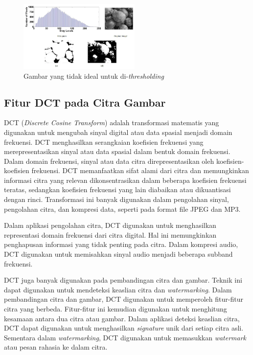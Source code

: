 \begin{figure}[!ht]
	\centering
	\includegraphics[width=6cm]{contents/chapter-2/2-histogramnonideal.png}
	\caption[Gambar yang tidak ideal untuk di-\emph{thresholding}]{Gambar yang tidak ideal untuk di-\emph{thresholding} \cite{fiturhistogram}}
	\label{Fig: 2-histogramnonideal}
\end{figure}

\clearpage

\subsection{Fitur DCT pada Citra Gambar}
DCT (\emph{Discrete Cosine Transform}) adalah transformasi matematis yang digunakan untuk mengubah sinyal digital atau data spasial menjadi domain frekuensi.
DCT menghasilkan serangkaian koefisien frekuensi yang merepresentasikan sinyal atau data spasial dalam bentuk domain frekuensi. Dalam domain frekuensi, sinyal
atau data citra direpresentasikan oleh koefisien-koefisien frekuensi. DCT memanfaatkan sifat alami dari citra dan memungkinkan informasi citra yang relevan
dikonsentrasikan dalam beberapa koefisien frekuensi teratas, sedangkan koefisien frekuensi yang lain diabaikan atau dikuantisasi dengan rinci. Transformasi ini
banyak digunakan dalam pengolahan sinyal, pengolahan citra, dan kompresi data, seperti pada format file JPEG dan MP3. \cite{dct}

Dalam aplikasi pengolahan citra, DCT digunakan untuk menghasilkan representasi domain frekuensi dari citra digital. Hal ini memungkinkan penghapusan informasi
yang tidak penting pada citra. Dalam kompresi audio, DCT digunakan untuk memisahkan sinyal audio menjadi beberapa subband frekuensi. \cite{dct}

DCT juga banyak digunakan pada pembandingan citra dan gambar. Teknik ini dapat digunakan untuk mendeteksi keaslian citra dan \emph{watermarking}. Dalam
pembandingan citra dan gambar, DCT digunakan untuk memperoleh fitur-fitur citra yang berbeda. Fitur-fitur ini kemudian digunakan untuk menghitung kesamaan
antara dua citra atau gambar. Dalam aplikasi deteksi keaslian citra, DCT dapat digunakan untuk menghasilkan \emph{signature} unik dari setiap citra asli.
Sementara dalam \emph{watermarking}, DCT digunakan untuk memasukkan \emph{watermark} atau pesan rahasia ke dalam citra. \cite{dctwatermark}


